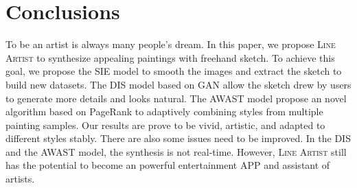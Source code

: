 \documentclass[10pt,twocolumn,letterpaper]{article}
\begin{document}
\section{Conclusions}
To be an artist is always many people's dream. In this paper, we propose \textsc{Line Artist} to synthesize appealing paintings with freehand sketch. To achieve this goal, we propose the SIE model to smooth the images and extract the sketch to build new datasets. The DIS model based on GAN allow the sketch drew by users to generate more details and looks natural. The AWAST model propose an novel algorithm based on PageRank to adaptively combining styles from multiple painting samples. Our results are prove to be vivid, artistic, and adapted to different styles stably. There are also some issues need to be improved. In the DIS and the AWAST model, the synthesis is not real-time. However, \textsc{Line Artist} still has the potential to become an powerful entertainment APP and assistant of artists.


\newpage

{\small


}
\end{document}
